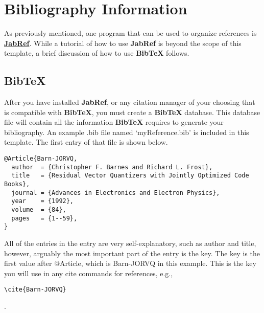 %
%
%
%


\chapter{Bibliography Information}\label{appendix:02}

As previously mentioned, one program that can be used to organize references is \href{http://www.jabref.org}{\textbf{JabRef}}. While a tutorial of how to use \textbf{JabRef} is beyond the scope of this template, a brief discussion of how to use \textbf{BibTeX} follows.

\section{BibTeX}
After you have installed \textbf{JabRef}, or any citation manager of your choosing that is compatible with \textbf{BibTeX}, you must create a \textbf{BibTeX} database. This database file will contain all the information \textbf{BibTeX} requires to generate your bibliography. An example .bib file named `myReference.bib' is included in this template. The first entry of that file is shown below.

{\footnotesize \begin{verbatim}
@Article{Barn-JORVQ,
  author  = {Christopher F. Barnes and Richard L. Frost},
  title   = {Residual Vector Quantizers with Jointly Optimized Code Books},
  journal = {Advances in Electronics and Electron Physics},
  year    = {1992},
  volume  = {84},
  pages   = {1--59},
}
\end{verbatim}}

All of the entries in the entry are very self-explanatory, such as author and title, however, arguably the most important part of the entry is the key. The key is the first value after @Article, which is Barn-JORVQ in this example. This is the key you will use in any cite commands for references, e.g.,

{\footnotesize\begin{verbatim}\cite{Barn-JORVQ}\end{verbatim}}.


